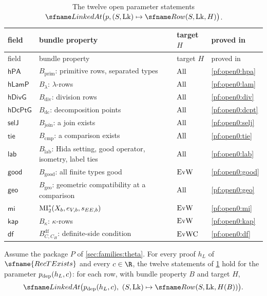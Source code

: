 {\small
\begin{longtable}{>{\raggedright\arraybackslash}p{}>{\raggedright\arraybackslash}p{}>{\raggedright\arraybackslash}p{}>{\raggedright\arraybackslash}p{}}
\caption{The twelve open parameter statements $\openzeroLinked\bigl(p,(S,\openzeroLk)\mapsto\openzeroRow(S,\openzeroLk,H)\bigr)$.}\label{pf:open0:tab}\\
\toprule
field & bundle property & target $H$ & proved in\\
\midrule
\endfirsthead
\toprule
field & bundle property & target $H$ & proved in\\
\midrule
\endhead
\bottomrule
\endfoot
$\mathsf{hPA}$ & $B_{\mathrm{prim}}$: primitive rows, separated types & $\mathrm{All}$ & \cref{pf:open0:hpa}\\
$\mathsf{hLamP}$ & $B_\lambda$: $\lambda$-rows & $\mathrm{All}$ & \cref{pf:open0:lam}\\
$\mathsf{hDivG}$ & $B_{\mathrm{div}}$: division rows & $\mathrm{All}$ & \cref{pf:open0:div}\\
$\mathsf{hDcPtG}$ & $B_{\mathrm{dc}}$: decomposition points & $\mathrm{All}$ & \cref{pf:open0:dcpt}\\
$\mathsf{selJ}$ & $B_{\mathrm{join}}$: a join exists & $\mathrm{All}$ & \cref{pf:open0:selj}\\
$\mathsf{tie}$ & $B_{\mathrm{cmp}}$: a comparison exists & $\mathrm{All}$ & \cref{pf:open0:tie}\\
$\mathsf{lab}$ & $B_{\mathrm{lab}}$: Hida setting, good operator, isometry, label ties & $\mathrm{All}$ & \cref{pf:open0:lab}\\
$\mathsf{good}$ & $B_{\mathrm{good}}$: all finite types good & $\mathrm{EvW}$ & \cref{pf:open0:good}\\
$\mathsf{geo}$ & $B_{\mathrm{geo}}$: geometric compatibility at a comparison & $\mathrm{All}$ & \cref{pf:open0:geo}\\
$\mathsf{mi}$ & $\mathrm{MI}^{*}_{2}(X_b,e_{V,b},s_{EE,b})$ & $\mathrm{EvW}$ & \cref{pf:open0:mi}\\
$\mathsf{kap}$ & $B_\kappa$: $\kappa$-rows & $\mathrm{EvW}$ & \cref{pf:open0:kap}\\
$\mathsf{df}$ & $B^{\mathrm{df}}_{C,C_H}$: definite-side condition & $\mathrm{EvWC}$ & \cref{pf:open0:df}\\
\end{longtable}
}

\begin{theorem}\label{pf:open0:main}
Assume the package $P$ of \cref{sec:families:theta}. For every proof $h_L$ of $\sfname{RecTExists}$ and every $c\in\R$,
the twelve statements of \cref{pf:open0:tab} hold for the parameter $p_{\mathrm{dep}}(h_L,c)$: for each row, with bundle
property $B$ and target $H$,
\[
\openzeroLinked\bigl(\openzeropdep(h_L,c),\ (S,\openzeroLk)\mapsto\openzeroRow(S,\openzeroLk,H(B))\bigr).
\]
\
\end{theorem}

